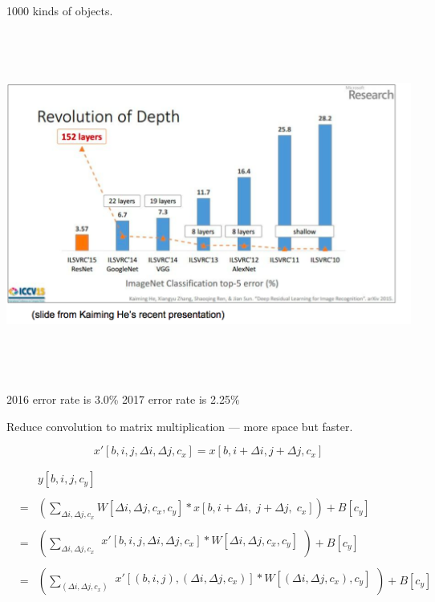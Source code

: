 {

1000 kinds of objects.

\vfill
\centerline{\includegraphics[height=4.5in]{../images/IVLSRC}}
2016 error rate is 3.0\% \hspace{1.0in} 2017 error rate is 2.25\%


Reduce convolution to matrix multiplication ---  more space but faster.
{\huge
  $$x'[b,i,j,\Delta i,\Delta j,c_x] = x[b,i+\Delta i,j+\Delta j,c_x]$$

\begin{eqnarray*}
  & & y[b,i,j,c_y] \\
  \\
  & = & \left(\sum_{\Delta i, \Delta j, c_x} W[\Delta i, \Delta j, c_x, c_y] *x[b,i + \Delta i,\; j + \Delta j,\; c_x]\right) + B[c_y] \\
  \\
      & = & \left(\sum_{\Delta i, \Delta j, c_x} \begin{array}{l}
                                              x'[b,i,j,\Delta i,\Delta j,c_x]
                                              * W[\Delta i, \Delta j, c_x, c_y] \\
  \end{array}\right) + B[c_y] \\
  \\
    & = & \left(\sum_{(\Delta i, \Delta j, c_x)} \begin{array}{l}
                                              x'[(b,i,j),(\Delta i,\Delta j,c_x)]
                                              * W[(\Delta i, \Delta j, c_x), c_y] \\
                                           \end{array}\right) + B[c_y]
\end{eqnarray*}
}

}
